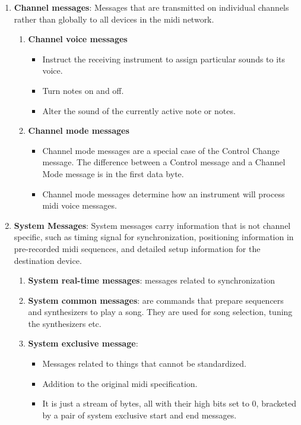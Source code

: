 \begin{enumerate}[label=\Alph*)]
	\item \textbf{Channel messages}:  Messages that are transmitted on individual channels rather than globally to all devices in the \gls{midi} network.
	
		\begin{enumerate}[label=\alph*)]
			\item \textbf{Channel voice messages}
			
			    \begin{itemize}
			    	\item Instruct the receiving instrument to assign particular sounds to its voice.
			    	\item Turn notes on and off.
			    	\item Alter the sound of the currently active note or notes.
			    \end{itemize}
		    
		\item \textbf{Channel mode messages}
		
		\begin{itemize}
			\item Channel mode messages are a special case of the Control Change message. The difference between a Control message and a Channel Mode message is in the first data byte. 
			
			\item Channel mode messages determine how an instrument will process \gls{midi} voice messages. 
		\end{itemize}
		
		
		\end{enumerate}
	
	\item \textbf{System Messages}: System messages carry information that is not channel specific, such as timing signal for synchronization, positioning information in pre-recorded \gls{midi} sequences, and detailed setup information for the destination device.  
	  \begin{enumerate}
	  	\item \textbf{System real-time messages}: messages related to synchronization 
	  	\item \textbf{System common messages}: are commands that prepare sequencers and
	  	synthesizers to play a song. They are used for song selection, tuning the
	  	synthesizers etc.
	  	 \item \textbf{System exclusive message}: 
	  	 \begin{itemize}
	  	 	\item Messages related to things that cannot be standardized.
	  	 	\item Addition to the original \gls{midi} specification. 
	  	 	\item It is just a stream of bytes, all with their high bits set to 0, bracketed by a pair of system exclusive start and end messages.
	  	 \end{itemize}
	  \end{enumerate}
  
 
\end{enumerate}

